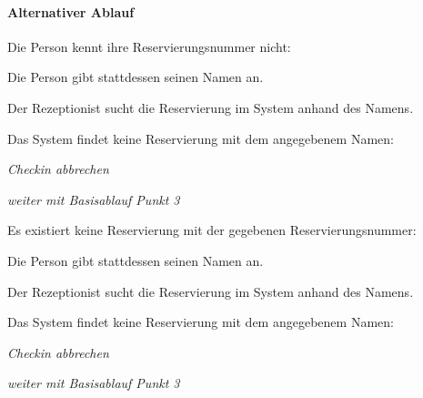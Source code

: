 \paragraph{Alternativer Ablauf}
\begin{longenum}
	\item
	\begin{longenum}
		\item Die Person kennt ihre \Gls{Reservierungsnummer} nicht:
		\begin{longenum}
			\item Die Person gibt stattdessen seinen Namen an.
			\item Der \Gls{Rezeptionist} sucht die \Gls{Reservierung} im System anhand des Namens.
			\begin{longenum}
				\item Das System findet keine \Gls{Reservierung} mit dem angegebenem Namen:
				\begin{longenum}
					\item \emph{\Gls{Checkin} abbrechen}
				\end{longenum}
			\end{longenum}
			\item \emph{weiter mit Basisablauf Punkt 3}
		\end{longenum}
	\end{longenum}
	\item
	\begin{longenum}
		\item Es existiert keine \Gls{Reservierung} mit der gegebenen \Gls{Reservierungsnummer}:
		\begin{longenum}
			\item Die Person gibt stattdessen seinen Namen an.
			\item Der \Gls{Rezeptionist} sucht die \Gls{Reservierung} im System anhand des Namens.
			\begin{longenum}
				\item Das System findet keine \Gls{Reservierung} mit dem angegebenem Namen:
				\begin{longenum}
					\item \emph{\Gls{Checkin} abbrechen}
				\end{longenum}
			\end{longenum}
			\item \emph{weiter mit Basisablauf Punkt 3}
		\end{longenum}
	\end{longenum}
	\item
	\item

\end{longenum}
